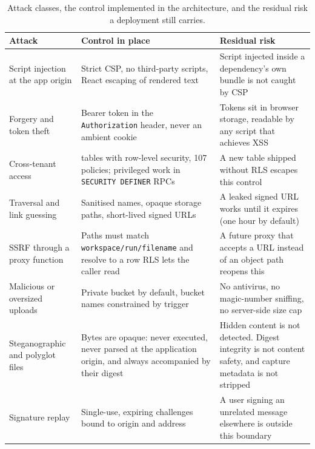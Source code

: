 \documentclass[10pt,a4paper,twocolumn]{article}
\begin{document}
\begin{table}[t]
\centering
\caption{Attack classes, the control implemented in the architecture, and the residual
risk a deployment still carries.}
\label{tab:attacks}
\footnotesize
\begin{tabular}{@{}>{\raggedright\arraybackslash}p{}
  >{\raggedright\arraybackslash}p{}
  >{\raggedright\arraybackslash}p{}@{}}
\toprule
Attack & Control in place & Residual risk \\
\midrule
Script injection at the app origin &
  Strict CSP, no third-party scripts, React escaping of rendered text &
  Script injected inside a dependency's own bundle is not caught by CSP \\

Forgery and token theft &
  Bearer token in the \texttt{Authorization} header, never an ambient cookie &
  Tokens sit in browser storage, readable by any script that achieves XSS \\

Cross-tenant access &
  80 tables with row-level security, 107 policies; privileged work in
  \texttt{SECURITY DEFINER} RPCs &
  A new table shipped without RLS escapes this control \\

Traversal and link guessing &
  Sanitised names, opaque storage paths, short-lived signed URLs &
  A leaked signed URL works until it expires (one hour by default) \\

SSRF through a proxy function &
  Paths must match \texttt{workspace/run/filename} and resolve to a row RLS lets
  the caller read &
  A future proxy that accepts a URL instead of an object path reopens this \\

Malicious or oversized uploads &
  Private bucket by default, bucket names constrained by trigger &
  No antivirus, no magic-number sniffing, no server-side size cap \\

Steganographic and polyglot files &
  Bytes are opaque: never executed, never parsed at the application origin, and
  always accompanied by their digest &
  Hidden content is not detected. Digest integrity is not content safety, and
  capture metadata is not stripped \\

Signature replay &
  Single-use, expiring challenges bound to origin and address &
  A user signing an unrelated message elsewhere is outside this boundary \\


\end{tabular}
\end{table}
\end{document}
